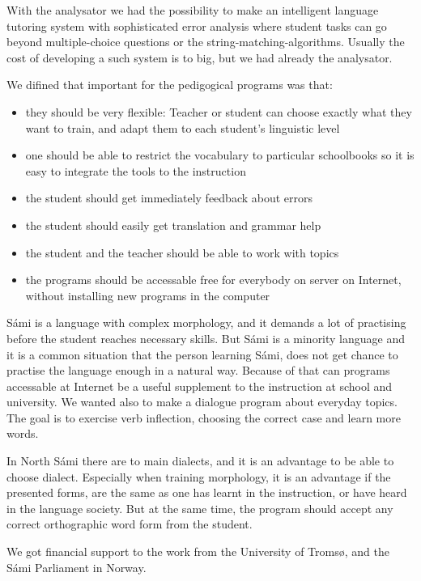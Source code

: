 \documentclass[a4paper,12pt]{article}
\begin{document}
With the analysator we had the possibility to make an intelligent language tutoring system with sophisticated error analysis where student tasks can go beyond multiple-choice questions or the string-matching-algorithms. Usually the cost of developing a such system is to big, but we had already the analysator.

We difined that important for the pedigogical programs was that:

\begin{itemize}
\item they should be very flexible: Teacher or student can choose exactly what they want to train, and adapt them to each student's linguistic level 
\item one should be able to restrict the vocabulary to particular schoolbooks so it is easy to integrate the tools to the instruction
\item the student should get immediately feedback about errors
\item the student should easily get translation and grammar help
\item the student and the teacher should be able to work with topics 
\item the programs should be accessable free for everybody on server on Internet, without installing new programs in the computer
\end{itemize}

Sámi is a language with complex morphology, and it demands a lot of practising before the student reaches necessary skills. But Sámi is a minority language and it is a common situation that the person learning Sámi, does not get chance to practise the language enough in a natural way. Because of that can programs accessable at Internet be a useful supplement to the instruction at school and university. We wanted also to make a dialogue program about everyday topics. The goal is to exercise verb inflection, choosing the correct case and learn more words. 

In North Sámi there are to main dialects, and it is an advantage to be able to choose dialect. Especially when training morphology, it is an advantage if the presented forms, are the same as one has learnt in the instruction, or have heard in the language society. But at the same time, the program should accept any correct orthographic word form from the student.

We got financial support to the work from the University of Tromsø, and the Sámi Parliament in Norway.
\end{document}
